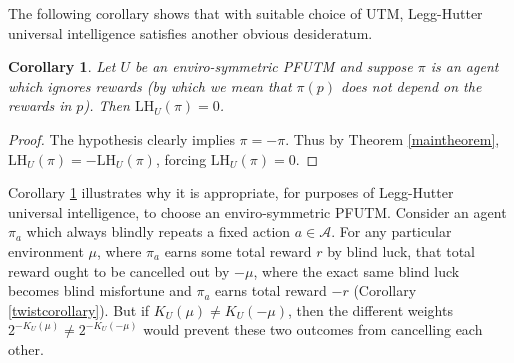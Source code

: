 \documentclass{article}
\newtheorem{corollary}[theorem]{Corollary}
\def\LH{\textrm{LH}}
\def\SYM{S}
\begin{document}



The following corollary shows that with suitable choice of UTM,
Legg-Hutter universal intelligence satisfies another obvious desideratum.

\begin{corollary}
\label{ignoringrewardscorollary}
    Let $U$ be an enviro-symmetric PFUTM and
    suppose $\pi$ is an agent which ignores rewards (by which we mean that
    $\pi(p)$ does not depend on the rewards in $p$).
    Then $\LH_U(\pi)=0$.
\end{corollary}

\begin{proof}
    The hypothesis clearly implies $\pi=-\pi$. Thus by Theorem
    \ref{maintheorem}, $\LH_U(\pi)=-\LH_U(\pi)$,
    forcing $\LH_U(\pi)=0$.
\end{proof}

Corollary \ref{ignoringrewardscorollary} illustrates why it is appropriate, for
purposes of Legg-Hutter universal intelligence, to choose an enviro-symmetric PFUTM.
Consider an agent $\pi_a$
which always blindly repeats a fixed action $a\in\mathcal A$.
For any particular environment $\mu$,
where $\pi_a$ earns some total reward $r$ by blind luck,
that total reward ought to be cancelled out by $-\mu$, where
the exact same blind luck becomes blind misfortune and $\pi_a$ earns total reward
$-r$ (Corollary \ref{twistcorollary}). But if $K_U(\mu)\not=K_U(-\mu)$,
then the different weights $2^{-K_U(\mu)}\not=2^{-K_U(-\mu)}$ would prevent
these two outcomes from cancelling each other.
\end{document}
